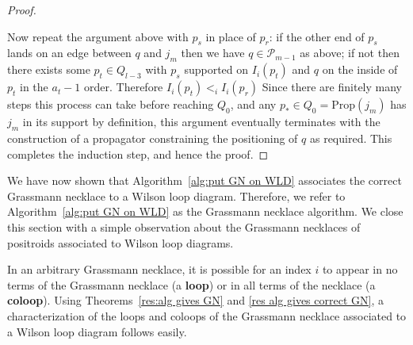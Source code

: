 \documentclass[11pt]{article}
\newcommand{\hlfix}[2]{\texthl{#1}\todo{#2}}
\newcommand{\cP}{\mathcal{P}}
\newcommand{\Prop}{\textrm{Prop}}
\theoremstyle{remark}
\theoremstyle{definition}
\begin{document}
\begin{proof}
\begin{figure}
\end{figure}
Now repeat the argument above with $p_s$ in place of $p_r$: if the other end of $p_s$ lands on an edge between $q$ and $j_m$ then we have $q \in \cP_{m-1}$ as above; if not then there exists some $p_t \in Q_{l-3}$ with $p_s$ supported on $I_i(p_t)$ and $q$ on the inside of $p_t$ in the $a_t-1$ order. Therefore $I_i(p_t) <_i I_i(p_r)$
Since there are finitely many steps this process can take before reaching $Q_0$, and any $p_* \in Q_0  = \Prop(j_m)$ has $j_m$ in its support by definition, this argument eventually terminates with the construction of a propagator constraining the positioning of $q$ as required. This completes the induction step, and hence the proof.\end{proof}



We have now shown that Algorithm~\ref{alg:put GN on WLD} associates the correct Grassmann necklace to a Wilson loop diagram. Therefore, we refer to Algorithm~\ref{alg:put GN on WLD} as the Grassmann necklace algorithm. We close this section with a simple observation about the Grassmann necklaces of positroids associated to Wilson loop diagrams.


In an arbitrary Grassmann necklace, it is possible for an index $i$ to appear in no terms of the Grassmann necklace (a {\bf loop}) or in all terms of the necklace (a {\bf coloop}). Using Theorems~\ref{res:alg gives GN} and \ref{res alg gives correct GN}, a characterization of the loops and coloops of the Grassmann necklace associated to a Wilson loop diagram follows easily.
\end{document}
